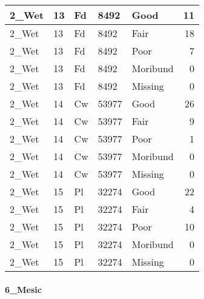 \documentclass[
]{article}
\begin{document}
\begin{tabular}{l|l|l|l|l|r}
\hline
2\_Wet & 13 & Fd & 8492 & Good & 11\\
\hline
2\_Wet & 13 & Fd & 8492 & Fair & 18\\
\hline
2\_Wet & 13 & Fd & 8492 & Poor & 7\\
\hline
2\_Wet & 13 & Fd & 8492 & Moribund & 0\\
\hline
2\_Wet & 13 & Fd & 8492 & Missing & 0\\
\hline
2\_Wet & 14 & Cw & 53977 & Good & 26\\
\hline
2\_Wet & 14 & Cw & 53977 & Fair & 9\\
\hline
2\_Wet & 14 & Cw & 53977 & Poor & 1\\
\hline
2\_Wet & 14 & Cw & 53977 & Moribund & 0\\
\hline
2\_Wet & 14 & Cw & 53977 & Missing & 0\\
\hline
2\_Wet & 15 & Pl & 32274 & Good & 22\\
\hline
2\_Wet & 15 & Pl & 32274 & Fair & 4\\
\hline
2\_Wet & 15 & Pl & 32274 & Poor & 10\\
\hline
2\_Wet & 15 & Pl & 32274 & Moribund & 0\\
\hline
2\_Wet & 15 & Pl & 32274 & Missing & 0\\
\hline
\end{tabular}

\hypertarget{mesic-9}{%
\paragraph{6\_Mesic}\label{mesic-9}}
\end{document}

